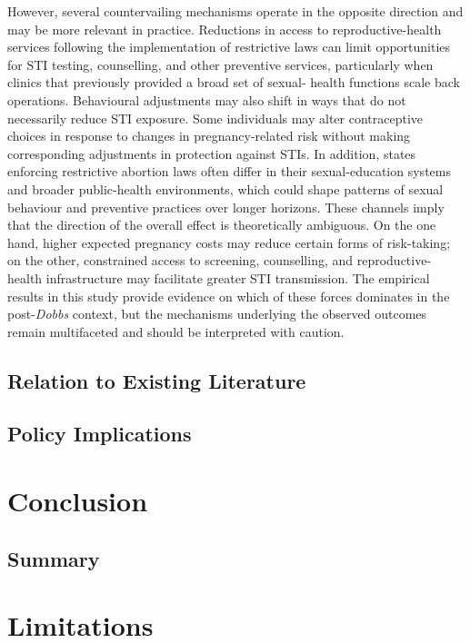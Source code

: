 \documentclass{article}
\begin{document}
However, several countervailing mechanisms operate in the opposite direction and may be more relevant in practice. Reductions in access to reproductive-health services following the implementation of restrictive laws can limit opportunities for STI testing, counselling, and other preventive services, particularly when clinics that previously provided a broad set of sexual- health functions scale back operations. Behavioural adjustments may also shift in ways that do not necessarily reduce STI exposure. Some individuals may alter contraceptive choices in response to changes in pregnancy-related risk without making corresponding adjustments in protection against STIs. In addition, states enforcing restrictive abortion laws often differ in their sexual-education systems and broader public-health environments, which could shape patterns of sexual behaviour and preventive practices over longer horizons. These channels imply that the direction of the overall effect is theoretically ambiguous. On the one hand, higher expected pregnancy costs may reduce certain forms of risk-taking; on the other, constrained access to screening, counselling, and reproductive-health infrastructure may facilitate greater STI transmission. The empirical results in this study provide evidence on which of these forces dominates in the post-\textit{Dobbs} context, but the mechanisms underlying the observed outcomes remain multifaceted and should be interpreted with caution.

\subsection{Relation to Existing Literature}
\subsection{Policy Implications}

\section{Conclusion}\label{sec:conclusion}
\subsection{Summary}
\section{Limitations}
\end{document}

